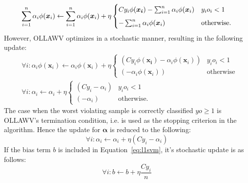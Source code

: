 \documentclass[reqno]{vcuthesis}
\numberwithin{equation}{chapter}
\begin{document}
\begin{equation*}
\centering
\sum_{i=1}^n \alpha_i \phi(\bm x_i) \leftarrow \sum_{i=1}^n \alpha_i \phi(\bm x_i) + \eta \begin{cases} 
															C y_i \phi(\bm{x_i}) - \sum_{i=1}^n \alpha_i \phi(\bm x_i) & y_i o_i < 1 \\[5pt]
															-\sum_{i=1}^n \alpha_i \phi(\bm x_i) & \text{otherwise}.
													 \end{cases}
\end{equation*}
However, OLLAWV optimizes in a stochastic manner, resulting in the following update:
\begin{align*}
&\forall i: \alpha_i \phi(\bm x_i) \leftarrow \alpha_i \phi(\bm x_i) + \eta \begin{cases} 
																													(Cy_i\phi(\bm{x_i}) - \alpha_i \phi(\bm x_i)) & y_i o_i < 1 \\
																													(- \alpha_i \phi(\bm x_i)) & \text{otherwise}
																													 \end{cases} \\							
&\forall i: \alpha_i \leftarrow \alpha_i + \eta \begin{cases} 
																(Cy_i - \alpha_i) & y_i o_i < 1 \\
																(- \alpha_i) & \text{otherwise}.
															\end{cases} 
\end{align*}
The case when the worst violating sample is correctly classified $yo \geq 1$ is OLLAWV's termination condition, i.e. is used as the stopping criterion in the algorithm. Hence the update for $\bm \alpha$ is reduced to the following:
\begin{equation}
\label{eq:alphaupdate}
\forall i: \alpha_i \leftarrow \alpha_i + \eta(Cy_i - \alpha_i)
\end{equation}
If the bias term $b$ is included in Equation~\ref{eq:l1svm}, it's stochastic update is as follows:
\begin{equation}
\label{eq:upbias}
\forall i: b \leftarrow b + \eta \frac{C y_i}{n}
\end{equation}
\end{document}
